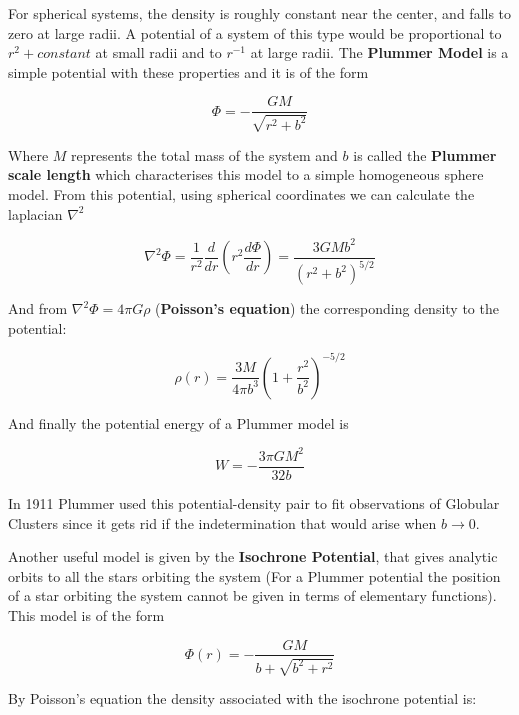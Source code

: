 For spherical systems, the density is roughly constant near the center, and falls to zero at large radii. A potential of a system of this type would be proportional to $r^{2} + constant$ at small radii and to $r^{-1}$ at large radii. The \textbf{Plummer Model} is a simple potential with these properties and it is of the form

\begin{equation}
\Phi=-\frac{GM}{\sqrt{r^{2}+b^{2}}}
\end{equation}

Where $M$ represents the total mass of the system and $b$ is called the \textbf{Plummer scale length} which characterises this model to a simple homogeneous sphere model. From this potential, using spherical coordinates we can calculate the laplacian $\nabla^{2}$

\begin{equation}
\nabla^{2}\Phi=\frac{1}{r^{2}}\frac{d}{dr}\left(r^{2}\frac{d\Phi}{dr}\right)=\frac{3GMb^{2}}{\left(r^{2}+b^{2}\right)^{5/2}}
\end{equation}

And from $\nabla^{2}\Phi=4\pi G\rho$ (\textbf{Poisson's equation}) the corresponding density to the potential:

\begin{equation}
\rho(r)=\frac{3M}{4\pi b^{3}}\left(1+\frac{r^{2}}{b^{2}}\right)^{-5/2}
\end{equation}

And finally the potential energy of a Plummer model is

\begin{equation}
W=-\frac{3\pi GM^{2}}{32b}
\end{equation}

In 1911 Plummer used this potential-density pair to fit observations of Globular Clusters since it gets rid if the indetermination that would arise when $b \rightarrow 0$.

Another useful model is given by the \textbf{Isochrone Potential}, that gives analytic orbits to all the stars orbiting the system (For a Plummer potential the position of a star orbiting the system cannot be given in terms of elementary functions). This model is of the form

\begin{equation}
\Phi(r)=-\frac{GM}{b+\sqrt{b^{2}+r^{2}}}
\end{equation}

By Poisson's equation the density associated with the isochrone potential is:

